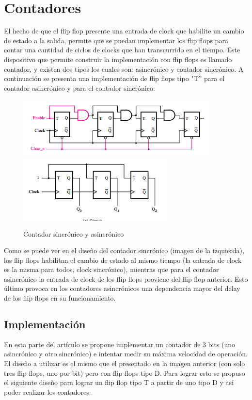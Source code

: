 \section{Contadores}

El hecho de que el flip flop presente una entrada de clock que habilite
un cambio de estado a la salida, permite que se puedan implementar
los flip flops para contar una cantidad de ciclos de clocks que han
transcurrido en el tiempo. Este dispositivo que permite construir
la implementación con flip flops es llamado contador, y existen dos
tipos los cuales son: asincrónico y contador sincrónico.
A continuación se presenta una implementación de flip flops tipo "T''
para el contador asincrónico y para el contador sincrónico:

\begin{figure}[H]
\centering
\includegraphics[scale=0.7]{sincCOUNTER.PNG}
\qquad
\includegraphics[scale=0.7]{asincCOUNTER.PNG}
\caption{Contador sincrónico y asincrónico}
\end{figure}

Como se puede ver en el diseño del contador sincrónico (imagen de
la izquierda), los flip flops habilitan el cambio de estado al mismo
tiempo (la entrada de clock es la misma para todos, clock sincrónico),
mientras que para el contador asincrónico la entrada de clock de los
flip flops proviene del flip flop anterior. Esto último provoca en
los contadores asincrónicos una dependencia mayor del delay de los
flip flops en su funcionamiento.

\subsection{Implementación}

En esta parte del artículo se propone implementar un contador de 3
bits (uno asincrónico y otro sincrónico) e intentar medir su máxima
velocidad de operación. El diseño a utilizar es el mismo que el presentado
en la imagen anterior (con solo tres flip flops, uno por bit) pero
con flip flops tipo D. Para lograr esto se propuso el siguiente diseño
para lograr un flip flop tipo T a partir de uno tipo D y así poder
realizar los contadores:

